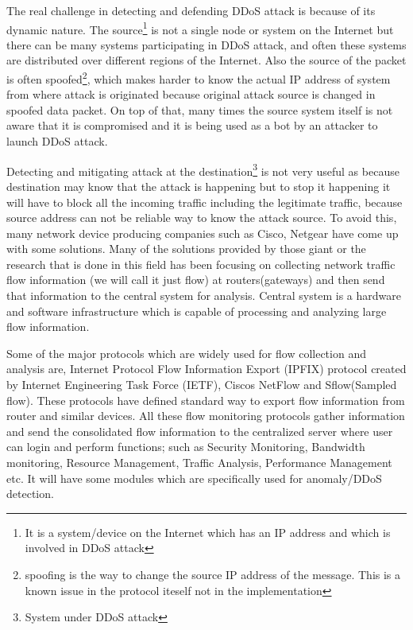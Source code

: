 \documentclass[10pt,oneside,a4paper]{article}
\begin{document}
The real challenge in detecting and defending DDoS attack is because of its dynamic nature. The source\footnote{It is a system/device on the Internet which has an IP address and which is involved in DDoS attack} is not a single node or system on the Internet but there can be many systems participating in DDoS attack, and often these systems are distributed over different regions of the Internet. Also the source of the packet is often spoofed\footnote{spoofing is the way to change the source IP address of the message. This is a known issue in the protocol iteself not in the implementation}\cite{ipspoofing}, which makes harder to know the actual IP address of system from where attack is originated because original attack source is changed in spoofed data packet. On top of that, many times the source system itself is not aware that it is compromised and it is being used as a bot\cite{bot} by an attacker to launch DDoS attack.

Detecting and mitigating attack at the destination\footnote{System under DDoS attack} is not very useful as because destination may know that the attack is happening but to stop it happening it will have to block all the incoming traffic including the legitimate traffic, because source address can not be reliable way to know the attack source. To avoid this, many network device producing companies such as Cisco, Netgear have come up with some solutions. Many of the solutions provided by those giant or the research that is done in this field has been focusing on collecting network traffic flow information\cite{networkTrafficFlow} (we will call it just flow) at routers(gateways) and then send that information to the central system for analysis. Central system is a hardware and software infrastructure which is capable of processing and analyzing large flow information.\par

Some of the major protocols which are widely used for flow collection and analysis are, Internet Protocol Flow Information Export (IPFIX) protocol created by Internet Engineering Task Force (IETF), Ciscos NetFlow\cite{cisconetflow} and Sflow(Sampled flow)\cite{sflow}. These protocols have defined standard way to export flow information from router and similar devices. All these flow monitoring protocols gather information and send the consolidated flow information to the centralized server where user can login and perform functions; such as Security Monitoring, Bandwidth monitoring, Resource Management, Traffic Analysis, Performance Management etc. It will have some modules which are specifically used for anomaly/DDoS detection.\par
\end{document}
